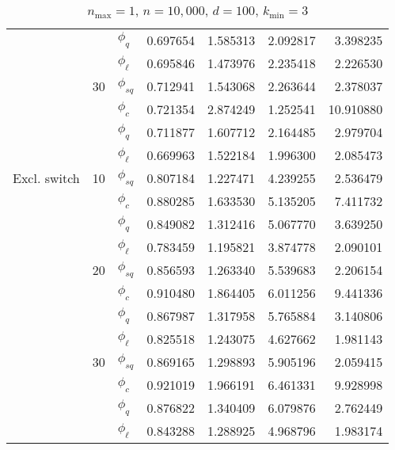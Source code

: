 \begin{table}[]
{\begin{tabular}{l@{\hskip 12pt}l@{\hskip 12pt}l@{\hskip 12pt}r@{\hskip 12pt}r@{\hskip 12pt}r@{\hskip 12pt}r}
            &    &$\phi_{q}$ &  0.697654 &  1.585313 &    2.092817 &   3.398235 \\
            &    & $\phi_{\ell}$ &  0.695846 &  1.473976 &    2.235418 &   2.226530 \\\cmidrule{2-7}
            & 30 &$\phi_{sq}$ &  0.712941 &  1.543068 &    2.263644 &   2.378037 \\
            &    &$\phi_{c}$ &  0.721354 &  2.874249 &    1.252541 &  10.910880 \\
            &    &$\phi_{q}$ &  0.711877 &  1.607712 &    2.164485 &   2.979704 \\
            &    & $\phi_{\ell}$ &  0.669963 &  1.522184 &    1.996300 &   2.085473 \\\midrule
Excl. switch & 10 &$\phi_{sq}$ &  0.807184 &  1.227471 &    4.239255 &   2.536479 \\
            &    &$\phi_{c}$ &  0.880285 &  1.633530 &    5.135205 &   7.411732 \\
            &    &$\phi_{q}$ &  0.849082 &  1.312416 &    5.067770 &   3.639250 \\
            &    & $\phi_{\ell}$ &  0.783459 &  1.195821 &    3.874778 &   2.090101 \\\cmidrule{2-7}
            & 20 &$\phi_{sq}$ &  0.856593 &  1.263340 &    5.539683 &   2.206154 \\
            &    &$\phi_{c}$ &  0.910480 &  1.864405 &    6.011256 &   9.441336 \\
            &    &$\phi_{q}$ &  0.867987 &  1.317958 &    5.765884 &   3.140806 \\
            &    & $\phi_{\ell}$ &  0.825518 &  1.243075 &    4.627662 &   1.981143 \\\cmidrule{2-7}
            & 30 &$\phi_{sq}$ &  0.869165 &  1.298893 &    5.905196 &   2.059415 \\
            &    &$\phi_{c}$ &  0.921019 &  1.966191 &    6.461331 &   9.928998 \\
            &    &$\phi_{q}$ &  0.876822 &  1.340409 &    6.079876 &   2.762449 \\
            &    & $\phi_{\ell}$ &  0.843288 &  1.288925 &    4.968796 &   1.983174 \\
\bottomrule
\end{tabular}}
    \caption{$n_{\max}=1$, $n=10,\!000$, $d=100$, $k_{\min}=3$}
    \label{tab:eff1}
\end{table}

